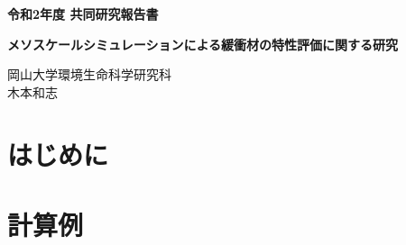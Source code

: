 ﻿\documentclass[11pt,a4j]{jarticle}
\newlength{\minitwocolumn}
\begin{document}
\newcommand{\fat}[1]{\mbox{\boldmath $#1$}}
\newcommand{\D}{\partial}
\newcommand{\w}{\omega}
\newcommand{\ga}{\alpha}
\newcommand{\gb}{\beta}
\newcommand{\gx}{\xi}
\newcommand{\gz}{\zeta}
\newcommand{\vhat}[1]{\hat{\fat{#1}}}
\newcommand{\spc}{\vspace{0.7\baselineskip}}
\newcommand{\halfspc}{\vspace{0.3\baselineskip}}

\newcommand{\twofig}[2]
 {
   \begin{figure}[h]
     \begin{minipage}[t]{\minitwocolumn}
         \begin{center}   #1
         \end{center}
     \end{minipage}
         \hspace{\columnsep}
     \begin{minipage}[t]{\minitwocolumn}
         \begin{center} #2
         \end{center}
     \end{minipage}
   \end{figure}
 }
\begin{center}
{\Large \bf 令和2年度 共同研究報告書}
\end{center}
\vspace{2mm}
\begin{center}
{\LARGE \bf 
メソスケールシミュレーションによる緩衝材の特性評価に関する研究} 
\end{center}
\begin{center}
岡山大学環境生命科学研究科\\
木本和志
\end{center}
\vspace{10mm}
\section{はじめに}




\section{計算例}
%
\end{document}
